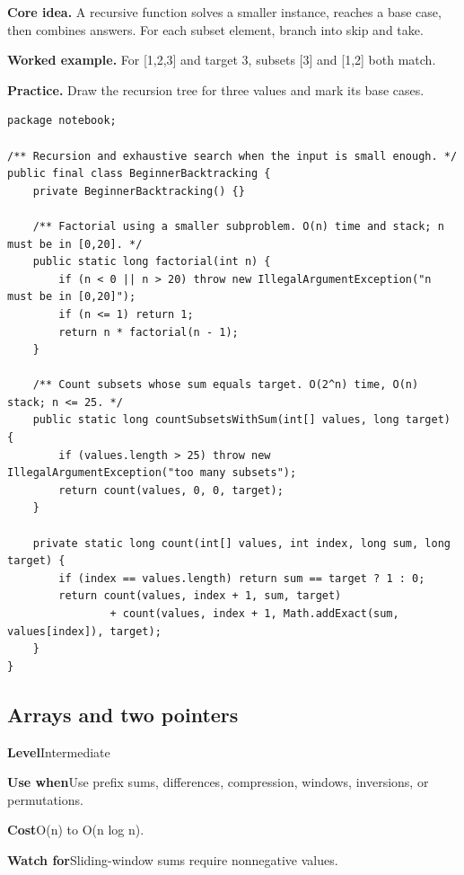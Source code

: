 \documentclass[10pt,letterpaper]{article}
\newcommand{\entrylabel}[1]{\textcolor{accent}{\bfseries #1}}
\begin{document}
\noindent\textbf{Core idea.} A recursive function solves a smaller instance, reaches a base case, then combines answers. For each subset element, branch into skip and take.\par
\noindent\textbf{Worked example.} For [1,2,3] and target 3, subsets [3] and [1,2] both match.\par
\noindent\textbf{Practice.} Draw the recursion tree for three values and mark its base cases.\par
\begin{lstlisting}
package notebook;

/** Recursion and exhaustive search when the input is small enough. */
public final class BeginnerBacktracking {
    private BeginnerBacktracking() {}

    /** Factorial using a smaller subproblem. O(n) time and stack; n must be in [0,20]. */
    public static long factorial(int n) {
        if (n < 0 || n > 20) throw new IllegalArgumentException("n must be in [0,20]");
        if (n <= 1) return 1;
        return n * factorial(n - 1);
    }

    /** Count subsets whose sum equals target. O(2^n) time, O(n) stack; n <= 25. */
    public static long countSubsetsWithSum(int[] values, long target) {
        if (values.length > 25) throw new IllegalArgumentException("too many subsets");
        return count(values, 0, 0, target);
    }

    private static long count(int[] values, int index, long sum, long target) {
        if (index == values.length) return sum == target ? 1 : 0;
        return count(values, index + 1, sum, target)
                + count(values, index + 1, Math.addExact(sum, values[index]), target);
    }
}
\end{lstlisting}
\subsection{Arrays and two pointers}
\begin{guidebox}\small
\entrylabel{Level}\quad Intermediate\par
\entrylabel{Use when}\quad Use prefix sums, differences, compression, windows, inversions, or permutations.\par
\entrylabel{Cost}\quad O(n) to O(n log n).\par
\entrylabel{Watch for}\quad Sliding-window sums require nonnegative values.\par
\end{guidebox}
\end{document}
